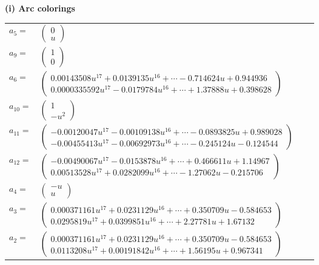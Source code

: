 \documentclass[1p]{elsarticle_modified}
\theoremstyle{definition}
\begin{document}
\flushleft \textbf{(i) Arc colorings}\\
\begin{tabular}{m{7pt} m{180pt} m{7pt} m{180pt} }
\flushright $a_{5}=$&$\begin{pmatrix}0\\u\end{pmatrix}$ \\
\flushright $a_{9}=$&$\begin{pmatrix}1\\0\end{pmatrix}$ \\
\flushright $a_{6}=$&$\begin{pmatrix}0.00143508 u^{17}+0.0139135 u^{16}+\cdots-0.714624 u+0.944936\\0.0000335592 u^{17}-0.0179784 u^{16}+\cdots+1.37888 u+0.398628\end{pmatrix}$ \\
\flushright $a_{10}=$&$\begin{pmatrix}1\\- u^2\end{pmatrix}$ \\
\flushright $a_{11}=$&$\begin{pmatrix}-0.00120047 u^{17}-0.00109138 u^{16}+\cdots-0.0893825 u+0.989028\\-0.00455413 u^{17}-0.00692973 u^{16}+\cdots-0.245124 u-0.124544\end{pmatrix}$ \\
\flushright $a_{12}=$&$\begin{pmatrix}-0.00490067 u^{17}-0.0153878 u^{16}+\cdots+0.466611 u+1.14967\\0.00513528 u^{17}+0.0282099 u^{16}+\cdots-1.27062 u-0.215706\end{pmatrix}$ \\
\flushright $a_{4}=$&$\begin{pmatrix}- u\\u\end{pmatrix}$ \\
\flushright $a_{3}=$&$\begin{pmatrix}0.000371161 u^{17}+0.0231129 u^{16}+\cdots+0.350709 u-0.584653\\0.0295819 u^{17}+0.0399851 u^{16}+\cdots+2.27781 u+1.67132\end{pmatrix}$ \\
\flushright $a_{2}=$&$\begin{pmatrix}0.000371161 u^{17}+0.0231129 u^{16}+\cdots+0.350709 u-0.584653\\0.0113208 u^{17}+0.00191842 u^{16}+\cdots+1.56195 u+0.967341\end{pmatrix}$ \\

\end{tabular}
\end{document}
